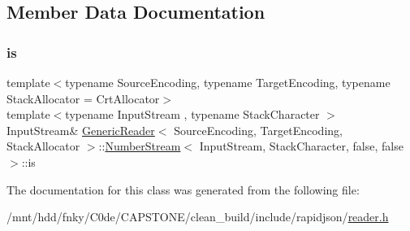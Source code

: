 \subsection{Member Data Documentation}
\mbox{\label{classGenericReader_1_1NumberStream_3_01InputStream_00_01StackCharacter_00_01false_00_01false_01_4_a757fc771328ce94b28df424a32e6407a}} 
\subsubsection{\texorpdfstring{is}{is}}
{\footnotesize\ttfamily template$<$typename Source\+Encoding, typename Target\+Encoding, typename Stack\+Allocator = Crt\+Allocator$>$ \\
template$<$typename Input\+Stream , typename Stack\+Character $>$ \\
Input\+Stream\& \hyperlink{classGenericReader}{Generic\+Reader}$<$ Source\+Encoding, Target\+Encoding, Stack\+Allocator $>$\+::\hyperlink{classGenericReader_1_1NumberStream}{Number\+Stream}$<$ Input\+Stream, Stack\+Character, false, false $>$\+::is\hspace{0.3cm}{\ttfamily [protected]}}



The documentation for this class was generated from the following file\+:\begin{DoxyCompactItemize}
\item 
/mnt/hdd/fnky/\+C0de/\+C\+A\+P\+S\+T\+O\+N\+E/clean\+\_\+build/include/rapidjson/\hyperlink{reader_8h}{reader.\+h}\end{DoxyCompactItemize}
